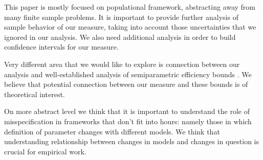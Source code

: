 \documentclass[12pt]{article}
\theoremstyle{plain}
\begin{document}
This paper is mostly focused on populational framework, abstracting away from many finite sample problems. It is important to provide further analysis of sample behavior of our measure, taking into account those uncertainties that we ignored in our analysis. We also need additional analysis in order to build confidence intervals for our measure.

Very different area that we would like to explore is connection between our analysis and well-established analysis of semiparametric efficiency bounds \parencite[see][]{bickel1993efficient}. We believe that potential connection between our measure and these bounds is of theoretical interest.  

On more abstract level we think that it is important to understand the role of misspecification in frameworks that don't fit into hours: namely those in which definition of parameter changes with different models. We think that understanding relationship between changes in models and changes in question is crucial for empirical work.


\printbibliography
\end{document}
